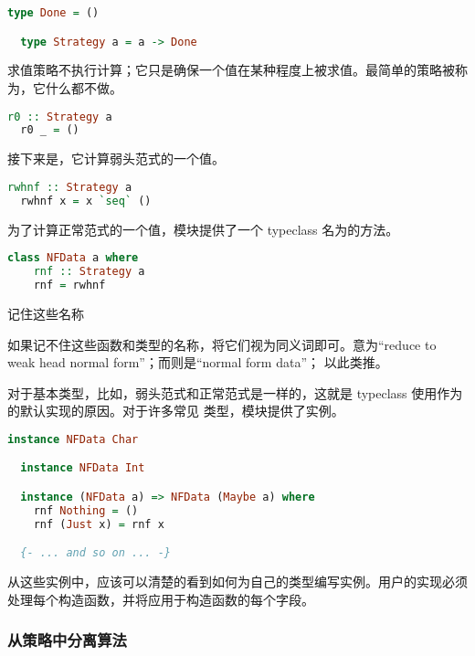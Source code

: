 \documentclass[./main.tex]{subfiles}
\begin{document}
\begin{lstlisting}[language=Haskell]
  type Done = ()

  type Strategy a = a -> Done
\end{lstlisting}

求值策略不执行计算；它只是确保一个值在某种程度上被求值。最简单的策略被称为，它什么都不做。

\begin{lstlisting}[language=Haskell]
  r0 :: Strategy a
  r0 _ = ()
\end{lstlisting}

接下来是，它计算弱头范式的一个值。

\begin{lstlisting}[language=Haskell]
  rwhnf :: Strategy a
  rwhnf x = x `seq` ()
\end{lstlisting}

为了计算正常范式的一个值，模块提供了一个 typeclass 名为的方法。

\begin{lstlisting}[language=Haskell]
  class NFData a where
    rnf :: Strategy a
    rnf = rwhnf
\end{lstlisting}

\begin{anote}
  记住这些名称

  如果记不住这些函数和类型的名称，将它们视为同义词即可。意为“reduce to weak head normal form”；而则是“normal form data”；
  以此类推。
\end{anote}

对于基本类型，比如，弱头范式和正常范式是一样的，这就是 typeclass 使用作为的默认实现的原因。对于许多常见
类型，模块提供了实例。

\begin{lstlisting}[language=Haskell]
  instance NFData Char

  instance NFData Int

  instance (NFData a) => NFData (Maybe a) where
    rnf Nothing = ()
    rnf (Just x) = rnf x

  {- ... and so on ... -}
\end{lstlisting}

从这些实例中，应该可以清楚的看到如何为自己的类型编写实例。用户的实现必须处理每个构造函数，并将应用于构造函数的每个字段。

\subsubsection*{从策略中分离算法}
\end{document}

